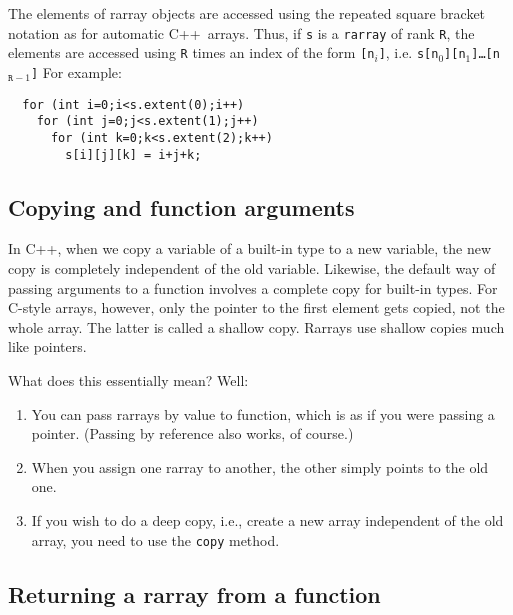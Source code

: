 \documentclass[11pt,twoside]{article}
\newcommand{\cxx}{C{++}}
\begin{document}
The elements of rarray objects are accessed using the repeated square
bracket notation as for automatic \cxx\ arrays. Thus, if \texttt{s} is a \texttt{rarray} of rank \texttt R, the elements are accessed using \texttt{R} times an index of the form \texttt{[n$_i$]}, i.e. \texttt{s[n$_0$][n$_1$]\dots[n$_{\texttt{R}-1}$]}
For example:\vspace{-9pt}
\begin{framed}\vspace{-18pt}%
\begin{verbatim}
  for (int i=0;i<s.extent(0);i++)
    for (int j=0;j<s.extent(1);j++)
      for (int k=0;k<s.extent(2);k++)
        s[i][j][k] = i+j+k;
\end{verbatim}%
\vspace{-12pt}
\end{framed}%

\subsection{Copying and function arguments}

In C++, when we copy a variable of a built-in type to a new variable, the new copy is completely independent of the old variable. Likewise, the default way of passing arguments to a function involves a complete copy for built-in types.  For C-style arrays, however, only the pointer to the first element gets copied, not the whole array. The latter is called a shallow copy. Rarrays use shallow copies much like pointers. 

What does this essentially mean? Well:
\begin{enumerate}
\item You can pass rarrays by value to function, which is as if you
  were passing a pointer. (Passing by reference also works, of course.)
\item When you assign one rarray to another, the other simply points to the old one.
\item If you wish to do a deep copy, i.e., create a new array independent of the old array, you need to use the \texttt{copy} method.
\end{enumerate}

\subsection{Returning a rarray from a function\label{returnvalues}}
\end{document}
